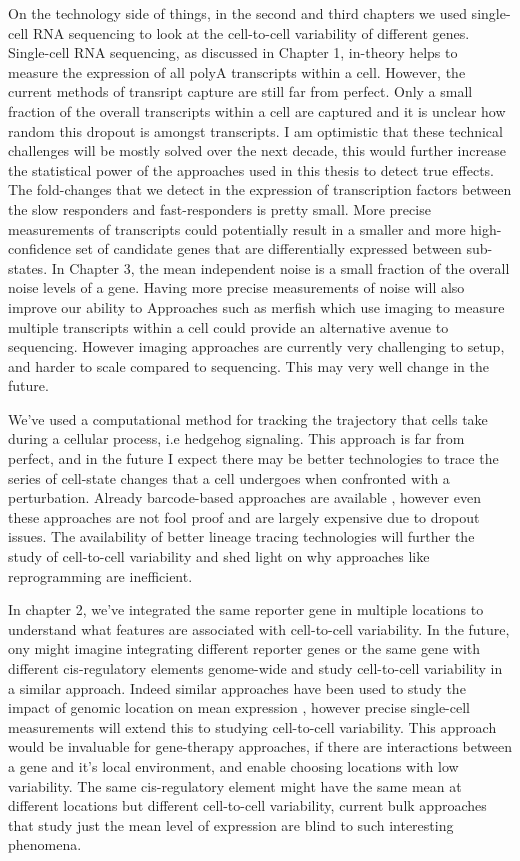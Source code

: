 On the technology side of things, in the second and third chapters we  used single-cell RNA sequencing to look at the cell-to-cell variability of different genes. Single-cell RNA sequencing, as discussed in Chapter 1, in-theory helps to measure the expression of all polyA transcripts within a cell. However, the current methods of transript capture are still far from perfect. Only a small fraction of the overall transcripts within a cell are captured \cite{pachter's postdoc} and it is unclear how random this dropout is amongst transcripts. I am optimistic that these technical challenges will be mostly solved over the next decade, this would further increase the statistical power of the approaches used in this thesis to detect true effects. The fold-changes that we detect in the expression of transcription factors between the slow responders and fast-responders is pretty small. More precise measurements of transcripts could potentially result in a smaller and more high-confidence set of candidate genes that are differentially expressed between sub-states. In Chapter 3, the mean independent noise is a small fraction of the overall noise levels of a gene. Having more precise measurements of noise will also improve our ability to Approaches such as merfish \cite{merfish} which use imaging to measure multiple transcripts within a cell could provide an alternative avenue to sequencing. However imaging approaches are currently very challenging to setup, and harder to scale compared to sequencing. This may very well change in the future.

We've used a computational method for tracking the trajectory that cells take during a cellular process, i.e hedgehog signaling. This approach is far from perfect, and in the future I expect there may be better technologies to trace the series of cell-state changes that a cell undergoes when confronted with a perturbation. Already barcode-based approaches are available \cite{morris lineaage tracing, arnav's paper}, however even these approaches are not fool proof and are largely expensive due to dropout issues. The availability of better lineage tracing technologies will further the study of cell-to-cell variability and shed light on why approaches like reprogramming are inefficient.

In chapter 2, we've integrated the same reporter gene in multiple locations to understand what features are associated with cell-to-cell variability. In the future, ony might imagine integrating different reporter genes or the same gene with different cis-regulatory elements genome-wide and study cell-to-cell variability in a similar approach. Indeed similar approaches have been used to study the impact of genomic location on mean expression \cite{claraice's papers}, however precise single-cell measurements will extend this to studying cell-to-cell variability. This approach would be invaluable for gene-therapy approaches, if there are interactions between a gene and it's local environment, and enable choosing locations with low variability. The same cis-regulatory element might have the same mean at different locations but different cell-to-cell variability, current bulk approaches that study just the mean level of expression are blind to such interesting phenomena.

